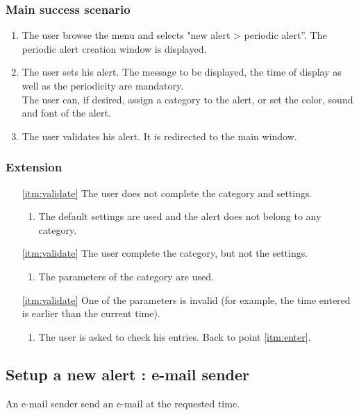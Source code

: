 \subsubsection{Main success scenario}
\begin{enumerate}
	\item The user browse the menu and selects "new alert > periodic alert''. The periodic alert creation window is displayed. 
	\item \label{itm:enter} The user sets his alert. The message to be displayed, the time of display as well as the periodicity are mandatory. \\The user can, if desired, assign a category to the alert, or set the color, sound and font of the alert.
	\item \label{itm:validate} The user validates his alert. It is redirected to the main window.
\end{enumerate}
\subsubsection{Extension}
\begin{enumerate}
	\item[\ref{itm:validate}] The user does not complete the category and settings.
	\begin{enumerate}[i]
		\item The default settings are used and the alert does not belong to any category.
	\end{enumerate}
	\item[\ref{itm:validate}] The user complete the category, but not the settings.
	\begin{enumerate}[i]
		\item The parameters of the category are used.
	\end{enumerate}
	\item[\ref{itm:validate}] One of the parameters is invalid (for example, the time entered is earlier than the current time).
	\begin{enumerate}[i]
		\item The user is asked to check his entries. Back to point \ref{itm:enter}.
	\end{enumerate}
\end{enumerate}

\subsection{Setup a new alert : e-mail sender}
An e-mail sender send an e-mail at the requested time.
